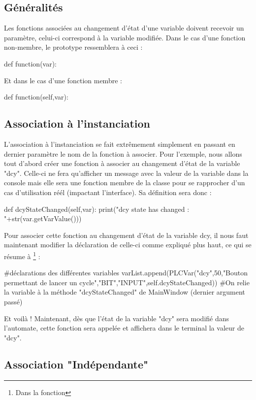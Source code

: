 \subsection{Généralités}

Les fonctions associées au changement d'état d'une variable doivent recevoir un paramètre, celui-ci correspond à la variable modifiée.
Dans le cas d'une fonction non-membre, le prototype ressemblera à ceci :
\begin{pyCode}
def function(var):
\end{pyCode}
Et dans le cas d'une fonction membre :
\begin{pyCode}
def function(self,var):
\end{pyCode}

\subsection{Association à l'instanciation}

L'association à l'instanciation se fait extrêmement simplement en passant en dernier paramètre le nom de la fonction à associer.\newline
Pour l'exemple, nous allons tout d'abord créer une fonction à associer au changement d'état de la variable "dcy". Celle-ci ne fera qu'afficher un message avec la valeur de la variable dans la console mais elle sera une fonction membre de la classe  pour se rapprocher d'un cas d'utilisation réél (impactant l'interface).\newline
Sa définition sera donc :
\begin{pyCode}
def dcyStateChanged(self,var):
		print("dcy state has changed : "+str(var.getVarValue()))
\end{pyCode}
\smallSkip
Pour associer cette fonction au changement d'état de la variable dcy, il nous faut maintenant modifier la déclaration de celle-ci comme expliqué plus haut, ce qui se résume à \footnote{Dans la fonction } :
\begin{pyCode}
#déclarations des différentes variables
varList.append(PLCVar("dcy",50,"Bouton permettant de lancer un cycle","BIT","INPUT",self.dcyStateChanged))
#On relie la variable à la méthode "dcyStateChanged" de MainWindow (dernier argument passé)
\end{pyCode}
 Et voilà ! Maintenant, dès que l'état de la variable "dcy" sera modifié dans l'automate, cette fonction sera appelée et affichera dans le terminal la valeur de "dcy".
 
 \subsection{Association "Indépendante"}
 
